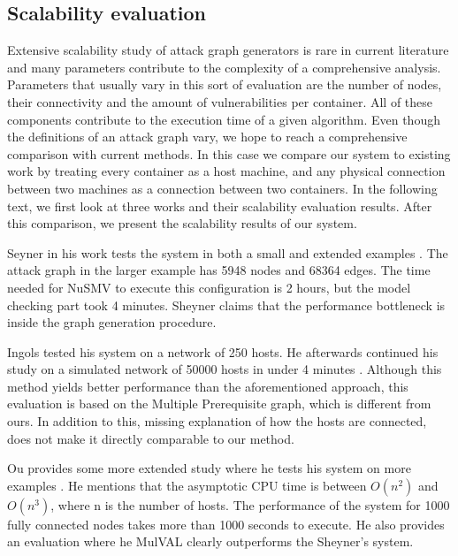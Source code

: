 \subsection{Scalability evaluation}
\label{chap:scalability_eval}
Extensive scalability study of attack graph generators  is rare in current literature and many parameters contribute to the complexity of a comprehensive analysis. Parameters that usually vary in this sort of evaluation are the number of nodes, their connectivity and the amount of vulnerabilities per container. All of these components contribute to the execution time of a given algorithm. Even though the definitions of an attack graph vary, we hope to reach a comprehensive comparison with current methods. In this case we compare our system to existing work by treating every container as a host machine, and any physical connection between two machines as a connection between two containers. In the following text, we first look at three works and their scalability evaluation results. After this comparison, we present the scalability results of our system.

Seyner in his work tests the system in both a small and extended examples \cite{sheyner2002automated}. The attack graph in the larger example has 5948 nodes and 68364 edges. The time needed for NuSMV to execute this configuration is 2 hours, but the model checking part took 4 minutes. Sheyner claims that the performance bottleneck is inside the graph generation procedure. 

Ingols tested his system on a network of 250 hosts. He afterwards continued his study on a simulated network of 50000 hosts in under 4 minutes \cite{ingols2006practical}. Although this method yields better performance than the aforementioned approach, this evaluation is based on the Multiple Prerequisite graph, which is different from ours. In addition to this, missing explanation of how the hosts are connected, does not make it directly comparable to our method.

Ou provides some more extended study where he tests his system on more examples \cite{ou2006scalable}. He mentions that the asymptotic CPU time is between $O(n^2)$ and $O(n^3)$, where n is the number of hosts. The performance of the system for 1000 fully connected nodes takes more than 1000 seconds to execute. He also provides an evaluation where he MulVAL clearly outperforms the Sheyner's system.





